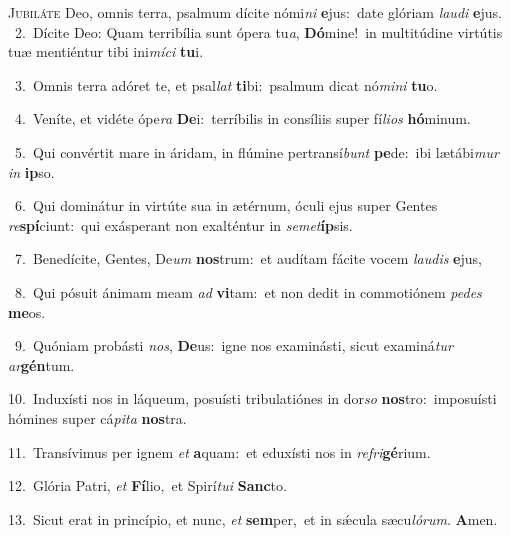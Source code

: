 \lettrine{\initial\textcolor{\initialcolor}{J}}{ubiláte} Deo, omnis terra, psalmum dícite nómi\textit{ni} \textbf{e}\-jus:~\star date glóriam \textit{lau}\-\textit{di} \textbf{e}\-jus.\\
{\numbfont\textcolor{\numbcolor}{~2.}}~Dícite Deo: Quam terribília sunt ópera tu\-\textit{a}\-, \textbf{Dó}\-mine!~\star in multitúdine virtútis tuæ mentiéntur tibi ini\-\textit{mí}\-\textit{ci} \textbf{tu}\-i.\par
{\numbfont\textcolor{\numbcolor}{~3.}}~Omnis terra adóret te, et psal\textit{lat} \textbf{ti}\-bi:~\star psalmum dicat nó\-\textit{mi}\-\textit{ni} \textbf{tu}\-o.\par
{\numbfont\textcolor{\numbcolor}{~4.}}~Veníte, et vidéte ópe\textit{ra} \textbf{De}\-i:~\star terríbilis in consíliis super fí\-\textit{li}\-\textit{os} \textbf{hó}\-minum.\par
{\numbfont\textcolor{\numbcolor}{~5.}}~Qui convértit mare in áridam, in flúmine pertransí\textit{bunt} \textbf{pe}\-de:~\star ibi lætábi\textit{mur} \textit{in} \textbf{ip}\-so.\par
{\numbfont\textcolor{\numbcolor}{~6.}}~Qui dominátur in virtúte sua in ætérnum, óculi ejus super Gentes \textit{re}\-\textbf{spí}ciunt:~\star qui exásperant non exalténtur in \textit{se}\-\textit{met}\textbf{íp}sis.\par
{\numbfont\textcolor{\numbcolor}{~7.}}~Benedícite, Gentes, De\textit{um} \textbf{nos}\-trum:~\star et audítam fácite vocem \textit{lau}\-\textit{dis} \textbf{e}\-jus,\par
{\numbfont\textcolor{\numbcolor}{~8.}}~Qui pósuit ánimam meam \textit{ad} \textbf{vi}\-tam:~\star et non dedit in commotiónem \textit{pe}\-\textit{des} \textbf{me}\-os.\par
{\numbfont\textcolor{\numbcolor}{~9.}}~Quóniam probásti \textit{nos}\-, \textbf{De}\-us:~\star igne nos examinásti, sicut examiná\textit{tur} \textit{ar}\-\textbf{gén}tum.\par
{\numbfont\textcolor{\numbcolor}{10.}}~Induxísti nos in láqueum, posuísti tribulatiónes in dor\textit{so} \textbf{nos}\-tro:~\star imposuísti hómines super cá\-\textit{pi}\-\textit{ta} \textbf{nos}\-tra.\par
{\numbfont\textcolor{\numbcolor}{11.}}~Transívimus per ignem \textit{et} \textbf{a}\-quam:~\star et eduxísti nos in \textit{re}\-\textit{fri}\textbf{gé}rium.\par
{\numbfont\textcolor{\numbcolor}{12.}}~Glória Patri, \textit{et} \textbf{Fí}\-lio,~\star et Spirí\-\textit{tu}\-\textit{i} \textbf{Sanc}\-to.\par
{\numbfont\textcolor{\numbcolor}{13.}}~Sicut erat in princípio, et nunc, \textit{et} \textbf{sem}\-per,~\star et in sǽcula sæcu\-\textit{ló}\-\textit{rum}. \textbf{A}\-men.\par

